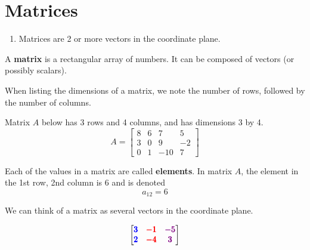 \documentclass{article}
\begin{document}
\section*{Matrices}

\begin{tcolorbox}[colframe=orange!70!white, coltitle=black, title=\textbf{Summary}]
\begin{enumerate}
    \item Matrices are 2 or more vectors in the coordinate plane.
\end{enumerate}
\end{tcolorbox}
\bigskip 

A \textbf{matrix} is a rectangular array of numbers. It can be composed of vectors (or possibly scalars).	
\bigskip 

When listing the dimensions of a matrix, we note the number of rows, followed by the number of columns. 
\bigskip 

Matrix $A$ below has 3 rows and 4 columns, and has dimensions 3 by 4.
\bigskip 
\[	A = \begin{bmatrix}
8 & 6 & 7 & 5 \\
3 & 0 & 9 & -2 \\
0 & 1 & -10 & 7 
\end{bmatrix}
\]
\bigskip 


Each of the values in a matrix are called \textbf{elements}. In matrix $A$, the element in the 1st row, 2nd column is 6 and is denoted
\[ a_{12} = 6 \]
\bigskip 

We can think of a matrix as several vectors in the coordinate plane. \newline 

\begin{minipage}{0.3\textwidth}
\[
\begin{bmatrix}
{\color{blue}\pmb{3}} & {\color{red}\pmb{-1}} & {\color{violet}\pmb{-5}} \\
{\color{blue}\pmb{2}} & {\color{red}\pmb{-4}} & {\color{violet}\pmb{3}} 
\end{bmatrix}
\]
\end{minipage}
\begin{minipage}{0.6\textwidth}
\end{minipage}
\bigskip 
\end{document}
